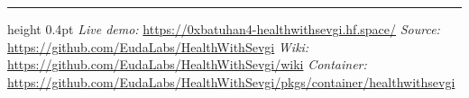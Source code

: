 \documentclass[10pt,a4paper,twocolumn]{article}
\begin{document}
\vspace{0.6ex}
\hrule height 0.4pt
\vspace{0.4ex}
{\footnotesize\textit{Live demo:} \url{https://0xbatuhan4-healthwithsevgi.hf.space/} \quad
\textit{Source:} \url{https://github.com/EudaLabs/HealthWithSevgi} \quad
\textit{Wiki:} \url{https://github.com/EudaLabs/HealthWithSevgi/wiki} \quad
\textit{Container:} \url{https://github.com/EudaLabs/HealthWithSevgi/pkgs/container/healthwithsevgi}}
\end{document}
